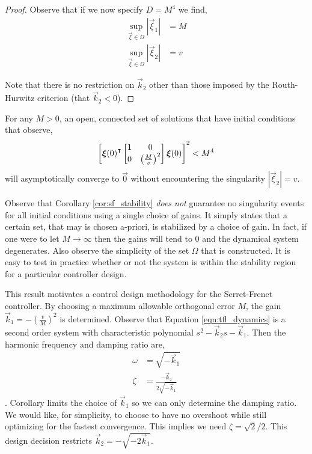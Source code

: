\documentclass[oneside, 11pt]{book}
\begin{document}
\begin{proof}
    Observe that if we now specify $D = M^4$ we find,
    \begin{align*}
        \sup_{\vec{\xi}\in\Omega}{\left|\vec{\xi}_1\right|} &= M\\
        \sup_{\vec{\xi}\in\Omega}{\left|\vec{\xi}_2\right|} &= v
    \end{align*}

    Note that there is no restriction on $\vec{k}_2$ other than those imposed by the Routh-Hurwitz criterion (that $\vec{k}_2<0$).
\end{proof}
\begin{corollary}
    For any $M > 0$, an open, connected set of solutions that have initial conditions that observe,
    \begin{equation*}
        \left[
        {\bm{\xi}(0)}^{\intercal}
        \begin{bmatrix}
            1 & 0\\
            0 & \left(\frac{M}{v}\right)^2
        \end{bmatrix}
        \bm{\xi}(0)
        \right]^2
        <
        M^4
    \end{equation*}
    will asymptotically converge to $\vec{0}$ without encountering the singularity $\left|\vec{\xi}_2\right|=v$.
    \label{cor:sf_stability}
\end{corollary}
Observe that Corollary \ref{cor:sf_stability} \emph{does not} guarantee no singularity events for all initial conditions using a single choice of gains. It simply states that a certain set, that may is chosen a-priori, is stabilized by a choice of gain. In fact, if one were to let $M\to\infty$ then the gains will tend to $0$ and the dynamical system degenerates. Also observe the simplicity of the set $\Omega$ that is constructed. It is easy to test in practice whether or not the system is within the stability region for a particular controller design.

This result motivates a control design methodology for the Serret-Frenet controller. By choosing a maximum allowable orthogonal error $M$, the gain $\vec{k}_1 = -(\frac{v}{M})^2$ is determined. Observe that Equation \ref{eqn:tfl_dynamics} is a second order system with characteristic polynomial $s^2 - \vec{k}_2 s - \vec{k}_1$. Then the harmonic frequency and damping ratio are,
\begin{align*}
    \omega &= \sqrt{-\vec{k}_1}\\
    \zeta &= \frac{-\vec{k}_2}{2 \sqrt{-\vec{k}_1}}
\end{align*}.
Corollary limits the choice of $\vec{k}_1$ so we can only determine the damping ratio. We would like, for simplicity, to choose to have no overshoot while still optimizing for the fastest convergence. This implies we need $\zeta = \sqrt{2}/2$. This design decision restricts $\vec{k}_2 = -\sqrt{-2\vec{k}_1}$.
\end{document}
